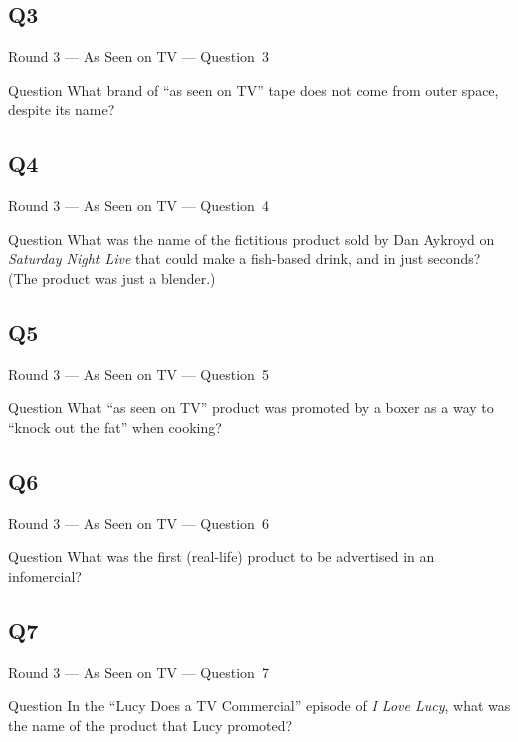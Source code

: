 \documentclass[11pt]{beamer}
\begin{document}
\subsection*{Q3}
\begin{frame}[t]{Round 3 --- As Seen on TV --- \mbox{Question 3}}
\vspace{-0.5em}
\begin{block}{Question}
What brand of ``as seen on TV'' tape does not come from outer space, despite its name?
\end{block}
\end{frame}
\subsection*{Q4}
\begin{frame}[t]{Round 3 --- As Seen on TV --- \mbox{Question 4}}
\vspace{-0.5em}
\begin{block}{Question}
What was the name of the fictitious product sold by Dan Aykroyd on \emph{Saturday Night Live} that could make a fish-based drink, and in just seconds? (The product was just a blender.)
\end{block}
\end{frame}
\subsection*{Q5}
\begin{frame}[t]{Round 3 --- As Seen on TV --- \mbox{Question 5}}
\vspace{-0.5em}
\begin{block}{Question}
What ``as seen on TV'' product was promoted by a boxer as a way to ``knock out the fat'' when cooking?
\end{block}
\end{frame}
\subsection*{Q6}
\begin{frame}[t]{Round 3 --- As Seen on TV --- \mbox{Question 6}}
\vspace{-0.5em}
\begin{block}{Question}
What was the first (real-life) product to be advertised in an infomercial?
\end{block}
\end{frame}
\subsection*{Q7}
\begin{frame}[t]{Round 3 --- As Seen on TV --- \mbox{Question 7}}
\vspace{-0.5em}
\begin{block}{Question}
In the ``Lucy Does a TV Commercial'' episode of \emph{I Love Lucy}, what was the name of the product that Lucy promoted?
\end{block}
\end{frame}
\end{document}
